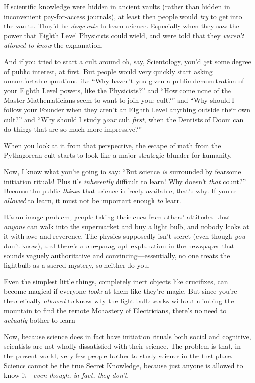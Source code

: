 {
 If scientific knowledge were hidden in ancient vaults (rather than
hidden in inconvenient pay-for-access journals), at least then people
would \textit{try} to get into the vaults. They'd be
\textit{desperate} to learn science. Especially when they saw the power
that Eighth Level Physicists could wield, and were told that they
\textit{weren't allowed to know} the explanation.}

{
 And if you tried to start a cult around oh, say, Scientology,
you'd get some degree of public interest, at first. But
people would very quickly start asking uncomfortable questions like
``Why haven't you given a public
demonstration of your Eighth Level powers, like the
Physicists?'' and ``How come none of
the Master Mathematicians seem to want to join your
cult?'' and ``Why should I follow
your Founder when they aren't an Eighth Level anything
outside their own cult?'' and ``Why
should I study \textit{your} cult \textit{first}, when the Dentists of
Doom can do things that are so much more
impressive?''}

{
 When you look at it from that perspective, the escape of math from
the Pythagorean cult starts to look like a major strategic blunder for
humanity.}

{
 Now, I know what you're going to say:
``But science \textit{is} surrounded by fearsome
initiation rituals! Plus it's \textit{inherently}
difficult to learn! Why doesn't \textit{that}
count?'' Because the public \textit{thinks} that
science is freely available, that's why. If
you're \textit{allowed} to learn, it must not be
important enough \textit{to} learn.}

{
 It's an image problem, people taking their cues
from others' attitudes. Just \textit{anyone} can walk
into the supermarket and buy a light bulb, and nobody looks at it with
awe and reverence. The physics supposedly isn't secret
(even though \textit{you} don't know), and
there's a one-paragraph explanation in the newspaper
that sounds vaguely authoritative and convincing---essentially, no one
treats the lightbulb as a sacred mystery, so neither do you.}

{
 Even the simplest little things, completely inert objects like
crucifixes, can become magical if everyone \textit{looks} at them like
they're magic. But since you're
theoretically \textit{allowed} to know why the light bulb works without
climbing the mountain to find the remote Monastery of Electricians,
there's no need to \textit{actually} bother to learn.}

{
 Now, because science does in fact have initiation rituals both
social and cognitive, scientists are not wholly dissatisfied with their
science. The problem is that, in the present world, very few people
bother to study science in the first place. Science cannot be the true
Secret Knowledge, because just anyone is allowed to know
it---\textit{even though, in fact, they don't}.}

